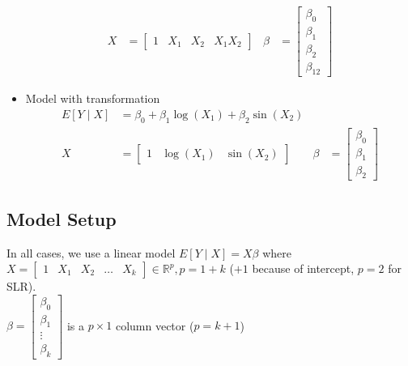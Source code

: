 \documentclass[12 pt]{article}
\begin{document}
\begin{itemize}
\begin{align*}
      \\ X & =
             \begin{bmatrix}
               1 & X_1 & X_2 & X_1X_2
             \end{bmatrix} & \beta & =
                                     \begin{bmatrix}
                                       \beta_0\\\beta_1\\\beta_2\\\beta_{12}
                                     \end{bmatrix}
    \end{align*}
  \item Model with transformation
    \begin{align*}
      E[Y \mid X] & = \beta_0 + \beta_1 \log(X_1) + \beta_2 \sin (X_{2})
      \\ X & =
             \begin{bmatrix}
               1 & \log(X_1) & \sin(X_2)
             \end{bmatrix}
                               & \beta & =
                                         \begin{bmatrix}
                                           \beta_0 \\ \beta_1 \\ \beta_2
                                         \end{bmatrix}
    \end{align*}
  \end{itemize}
  \subsection{Model Setup}
  In all cases, we use a linear model $E[Y \mid X] = X \beta$ where $X
  =
  \begin{bmatrix}
    1 & X_1 & X_2 & \ldots & X_k
  \end{bmatrix} \in \mathbb{R}^p, p = 1 + k$ ($+1$ because of
  intercept, $p = 2$ for SLR).
  \\ $\beta =
  \begin{bmatrix}
    \beta_0\\\beta_1 \\ \vdots \\ \beta_k
  \end{bmatrix}
  $ is a $p \times 1$ column vector ($p = k + 1$)
\end{document}
